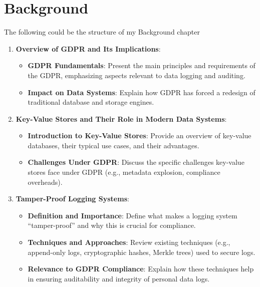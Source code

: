 \chapter{Background}\label{chapter:background}

The following could be the structure of my Background chapter

\begin{enumerate}
        \item \textbf{Overview of GDPR and Its Implications}:
              \begin{itemize}
                      \item \textbf{GDPR Fundamentals}:
                            Present the main principles and requirements of the GDPR, emphasizing aspects relevant to data logging and auditing.
                      \item \textbf{Impact on Data Systems}:
                            Explain how GDPR has forced a redesign of traditional database and storage engines.
              \end{itemize}
        \item \textbf{Key-Value Stores and Their Role in Modern Data Systems}:
              \begin{itemize}
                      \item \textbf{Introduction to Key-Value Stores}:
                            Provide an overview of key-value databases, their typical use cases, and their advantages.
                      \item \textbf{Challenges Under GDPR}:
                            Discuss the specific challenges key-value stores face under GDPR (e.g., metadata explosion, compliance overheads).
              \end{itemize}
        \item \textbf{Tamper-Proof Logging Systems}:
              \begin{itemize}
                      \item \textbf{Definition and Importance}:
                            Define what makes a logging system “tamper-proof” and why this is crucial for compliance.
                      \item \textbf{Techniques and Approaches}:
                            Review existing techniques (e.g., append-only logs, cryptographic hashes, Merkle trees) used to secure logs.
                      \item \textbf{Relevance to GDPR Compliance}:
                            Explain how these techniques help in ensuring auditability and integrity of personal data logs.

\end{itemize}
\end{enumerate}
